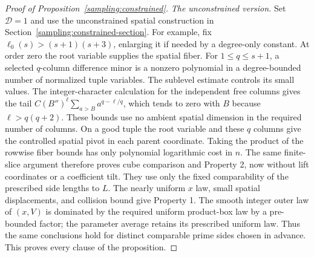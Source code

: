 \begin{proof}[Proof of Proposition~\ref{sampling:constrained}]
\emph{The unconstrained version.}
Set $\mathcal D=1$ and use the unconstrained spatial construction
in Section~\ref{sampling:constrained-section}.  For example, fix
$\ell_0(s)>(s+1)(s+3)$, enlarging it if needed by a degree-only
constant.  At order zero the root variable supplies the spatial fiber.
For $1\le q\le s+1$, a selected $q$-column
difference minor is a nonzero polynomial in a degree-bounded number
of normalized tuple variables.  The sublevel estimate controls its
small values.  The integer-character calculation for the independent
free columns gives the tail
$C(B'')^\ell\sum_{a>B}a^{q-\ell/q}$, which tends to zero with
$B$ because $\ell>q(q+2)$.  These bounds use no ambient spatial
dimension in the required number of columns.  On a good tuple the
root variable and these $q$ columns give the controlled spatial
pivot in each parent coordinate.  Taking the product of the
rowwise fiber bounds has only polynomial logarithmic cost in $n$.
The same finite-slice argument therefore proves cube comparison
and Property 2,
now without lift coordinates or a coefficient tilt.  They use only
the fixed comparability of the prescribed side lengths to $L$.
The nearly uniform $x$ law, small spatial displacements, and collision
bound give Property 1.  The smooth integer outer law of $(x,V)$ is
dominated by the required uniform product-box law by a pre-bounded
factor; the parameter average retains its prescribed uniform law.
Thus the same conclusions hold for distinct comparable prime sides
chosen in advance.  This proves every clause of the proposition.
\end{proof}
